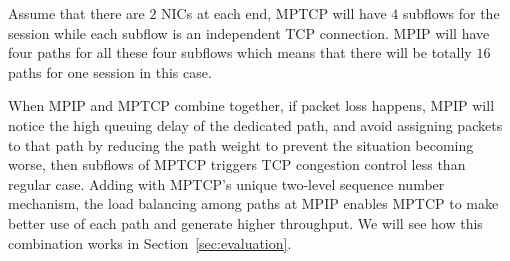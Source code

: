 Assume that there are $2$ NICs at each end, MPTCP will have $4$ subflows for the session while each subflow is an independent TCP connection. MPIP will have four paths for all these four subflows which means that there will be totally $16$ paths for one session in this case.

When MPIP and MPTCP combine together, if packet loss happens, MPIP will notice the high queuing delay of the dedicated path, and avoid assigning packets to that path by reducing the path weight to prevent the situation becoming worse, then subflows of MPTCP triggers TCP congestion control less than regular case. Adding with MPTCP's unique two-level sequence number mechanism, the load balancing among paths at MPIP enables MPTCP to make better use of each path and generate higher throughput. We will see how this combination works in Section~\ref{sec:evaluation}. 